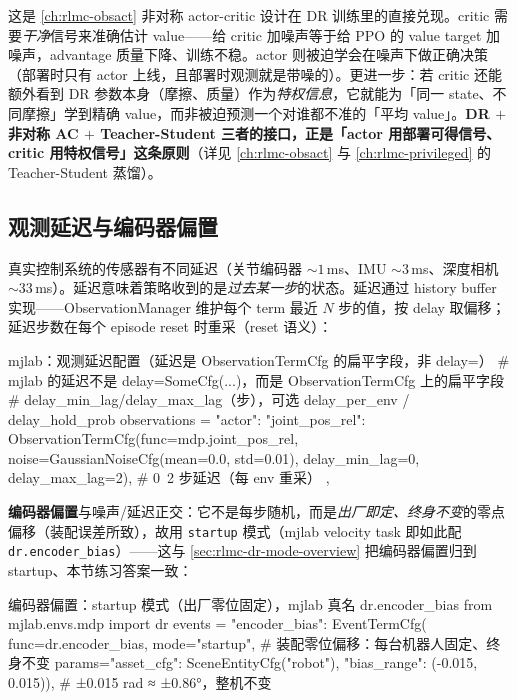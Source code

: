 \begin{insight}\label{ins:rlmc-dr-asym}
这是 \cref{ch:rlmc-obsact} 非对称 actor-critic 设计在 DR 训练里的直接兑现。critic 需要\emph{干净}信号来准确估计 value——给 critic 加噪声等于给 PPO 的 value target 加噪声，advantage 质量下降、训练不稳。actor 则被迫学会在噪声下做正确决策（部署时只有 actor 上线，且部署时观测就是带噪的）。更进一步：若 critic 还能额外看到 DR 参数本身（摩擦、质量）作为\emph{特权信息}，它就能为「同一 state、不同摩擦」学到精确 value，而非被迫预测一个对谁都不准的「平均 value」。\textbf{DR $+$ 非对称 AC $+$ Teacher-Student 三者的接口，正是「actor 用部署可得信号、critic 用特权信号」这条原则}（详见 \cref{ch:rlmc-obsact} 与 \cref{ch:rlmc-privileged} 的 Teacher-Student 蒸馏）。
\end{insight}

\subsection{观测延迟与编码器偏置}
\label{sec:rlmc-dr-sensor-delay}

真实控制系统的传感器有不同延迟（关节编码器 $\sim 1$\,ms、IMU $\sim 3$\,ms、深度相机 $\sim 33$\,ms）。延迟意味着策略收到的是\emph{过去某一步}的状态。延迟通过 history buffer 实现——ObservationManager 维护每个 term 最近 $N$ 步的值，按 delay 取偏移；延迟步数在每个 episode reset 时重采（reset 语义）：

\begin{codebox}[Python]{mjlab：观测延迟配置（延迟是 ObservationTermCfg 的扁平字段，非 delay=）}
# mjlab 的延迟不是 delay=SomeCfg(...)，而是 ObservationTermCfg 上的扁平字段
# delay_min_lag/delay_max_lag（步），可选 delay_per_env / delay_hold_prob
observations = {
  "actor": {
    "joint_pos_rel": ObservationTermCfg(func=mdp.joint_pos_rel,
        noise=GaussianNoiseCfg(mean=0.0, std=0.01),
        delay_min_lag=0, delay_max_lag=2),   # 0~2 步延迟（每 env 重采）
  },
}
\end{codebox}

\textbf{编码器偏置}与噪声/延迟正交：它不是每步随机，而是\emph{出厂即定、终身不变}的零点偏移（装配误差所致），故用 \verb|startup| 模式（mjlab velocity task 即如此配 \verb|dr.encoder_bias|）——这与 \cref{sec:rlmc-dr-mode-overview} 把编码器偏置归到 startup、本节练习答案一致：

\begin{codebox}[Python]{编码器偏置：startup 模式（出厂零位固定），mjlab 真名 dr.encoder\_bias}
from mjlab.envs.mdp import dr
events = {
  "encoder_bias": EventTermCfg(
      func=dr.encoder_bias, mode="startup",    # 装配零位偏移：每台机器人固定、终身不变
      params={"asset_cfg": SceneEntityCfg("robot"),
              "bias_range": (-0.015, 0.015)}),  # ±0.015 rad ≈ ±0.86°，整机不变
}
\end{codebox}

